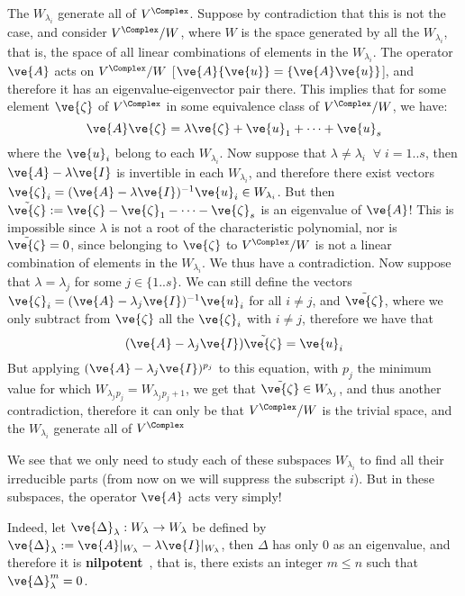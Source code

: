 The $W_{\lambda_i}$ generate all of $V^{\Complex}$. Suppose by contradiction that this
is not the case, and consider $V^{\Complex}/W$, where $W$ is the space generated by all
the $W_{\lambda_i}$, that is, the space of all linear combinations of 
elements in the $W_{\lambda_i}$. The operator $\ve{A}$ acts on $V^{\Complex}/W$
[$\ve{A}\{\ve{u}\} = \{\ve{A}\ve{u}\}$], and therefore it has an eigenvalue-eigenvector pair there. This implies that for some element $\ve{\zeta}$ of $V^{\Complex}$ 
in some equivalence class of $V^{\Complex}/W$, we have:
\begin{equation}
  \ve{A}\ve{\zeta} = \lambda \ve{\zeta} + \ve{u}_1 + \dots + \ve{u}_s
\end{equation}
%
where the $\ve{u}_i$ belong to each $W_{\lambda_i}$.
Now suppose that $\lambda \neq \lambda_i\;\; \forall\; i=1..s$, then 
$\ve{A} - \lambda\ve{I}$ is invertible in each $W_{\lambda_i}$, and therefore there exist vectors 
$\ve{\zeta}_i = (\ve{A} - \lambda\ve{I})^{-1} \ve{u}_i \in W_{\lambda_i}$.
But then 
$\tilde{\ve{\zeta}} := \ve{\zeta} - \ve{\zeta}_1 - \dots - \ve{\zeta}_s$
is an eigenvalue of $\ve{A}$! 
This is impossible since $\lambda$ is not a root of
the characteristic polynomial, nor is $\tilde{\ve{\zeta}}=0$, since 
belonging to $\ve{\zeta}$ to $V^{\Complex}/W$ is not
a linear combination of elements in the $W_{\lambda_i}$.
We thus have a contradiction.
Now suppose that $\lambda = \lambda_j$ for some $j \in \{1..s\}$.
We can still define the vectors 
$\ve{\zeta}_i =(\ve{A} - \lambda_j\ve{I})^{-1} \ve{u}_i$ for all $i\neq j$, and
$\tilde{\ve{\zeta}}$, where we only subtract from $\ve{\zeta}$ all the 
$\ve{\zeta}_i$ with $i\neq j$,
therefore we have that 
\begin{equation}
  (\ve{A} - \lambda_j\ve{I})\tilde{\ve{\zeta}} = \ve{u}_i
\end{equation}
But applying $(\ve{A} - \lambda_j\ve{I})^{p_j}$ to this equation, with
$p_j$ the minimum value for which $W_{\lambda_j}{}_{p_j} = W_{\lambda_j}{}_{p_j+1}$, 
we get that $\tilde{\ve{\zeta}} \in W_{\lambda_j}$, and thus another contradiction,
therefore it can only be that $V^{\Complex}/W$ is the trivial space, and the $W_{\lambda_i}$
generate all of $V^{\Complex}$
\epru
\espa

We see that we only need to study each of these subspaces
$W_{\lambda_i}$ to find all their irreducible parts (from now on
we will suppress the subscript $i$).
But in these subspaces, the operator
$\ve{A}$ acts very simply!

Indeed, let $\ve{\Delta}_{\lambda}: W_{\lambda} \to W_{\lambda}$ 
be defined by  
$\ve{\Delta}_{\lambda}:= \ve{A}|_{W_{\lambda}} - \lambda \ve{I}|_{W_{\lambda}}$, 
then $\Delta$ has only $0$ as an eigenvalue, and therefore it is 
\textbf{nilpotent}~, that is, there exists an integer $m \leq n$
such that $\ve{\Delta}_{\lambda}^m =0$.
\espa

